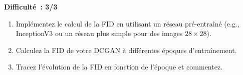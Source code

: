 \begin{exercice}
\label{exo:fid-compute}
\textbf{Difficult\'e~: 3/3}
\begin{enumerate}
    \item Impl\'ementez le calcul de la FID en utilisant un r\'eseau pr\'e-entra\^in\'e (e.g., InceptionV3 ou un r\'eseau plus simple pour des images $28 \times 28$).
    \item Calculez la FID de votre DCGAN \`a diff\'erentes \'epoques d'entra\^inement.
    \item Tracez l'\'evolution de la FID en fonction de l'\'epoque et commentez.
\end{enumerate}
\end{exercice}

